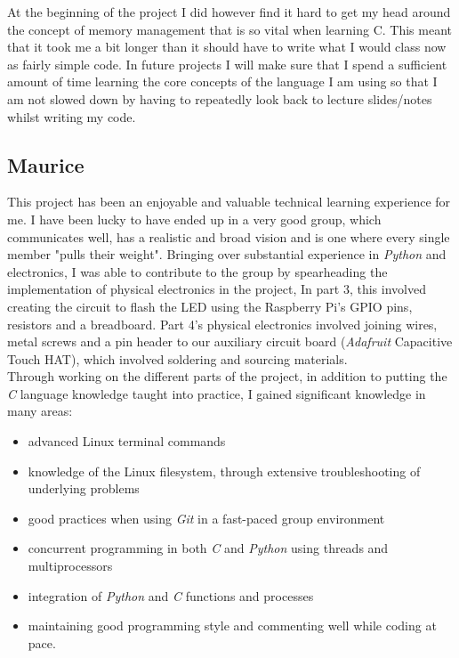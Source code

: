 \documentclass[11pt]{article}
\begin{document}
At the beginning of the project I did however find it hard to get my head around the concept of memory management that is so vital when learning C. This meant that it took me a bit longer than it should have to write what I would class now as fairly simple code. In future projects I will make sure that I spend a sufficient amount of time learning the core concepts of the language I am using so that I am not slowed down by having to repeatedly look back to lecture slides/notes whilst writing my code.

\subsection{Maurice}
This project has been an enjoyable and valuable technical learning experience for me. I have been lucky to have ended up in a very good group, which communicates well, has a realistic and broad vision and is one where every single member "pulls their weight". Bringing over substantial experience in \textit{Python} and electronics, I was able to contribute to the group by spearheading the implementation of physical electronics in the project, In part 3, this involved creating the circuit to flash the LED using the Raspberry Pi's GPIO pins, resistors and a breadboard. Part 4's physical electronics involved joining wires, metal screws and a pin header to our auxiliary circuit board (\textit{Adafruit} Capacitive Touch HAT), which involved soldering and sourcing materials.\\

Through working on the different parts of the project, in addition to putting the \textit{C} language knowledge taught into practice, I gained significant knowledge in many areas:
\begin{itemize}
\item advanced Linux terminal commands
\item knowledge of the Linux filesystem, through extensive troubleshooting of underlying problems
\item good practices when using \textit{Git} in a fast-paced group environment
\item concurrent programming in both \textit{C} and \textit{Python} using threads and multiprocessors
\item integration of \textit{Python} and \textit{C} functions and processes
\item maintaining good programming style and commenting well while coding at pace.
\end{itemize}
\end{document}

